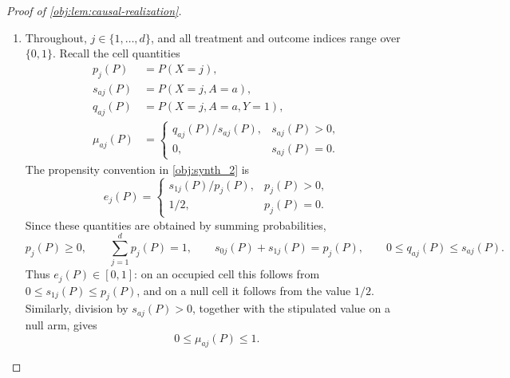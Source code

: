 \begin{proof}[Proof of \cref{obj:lem:causal-realization}]
\begin{enumerate}
\item
Throughout, \(j\in\{1,\ldots,d\}\), and all treatment and outcome indices range over \(\{0,1\}\). Recall the cell quantities
\[
\begin{aligned}
p_j(P)&=P(X=j),\\
s_{aj}(P)&=P(X=j,A=a),\\
q_{aj}(P)&=P(X=j,A=a,Y=1),\\
\mu_{aj}(P)&=
\begin{cases}
q_{aj}(P)/s_{aj}(P),&s_{aj}(P)>0,\\
0,&s_{aj}(P)=0.
\end{cases}
\end{aligned}
\]
The propensity convention in \cref{obj:synth_2} is
\[
e_j(P)=
\begin{cases}
s_{1j}(P)/p_j(P),&p_j(P)>0,\\
1/2,&p_j(P)=0.
\end{cases}
\]
Since these quantities are obtained by summing probabilities,
\[
p_j(P)\ge0,\qquad
\sum_{j=1}^{d}p_j(P)=1,\qquad
s_{0j}(P)+s_{1j}(P)=p_j(P),\qquad
0\le q_{aj}(P)\le s_{aj}(P).
\]
Thus \(e_j(P)\in[0,1]\): on an occupied cell this follows from
\(0\le s_{1j}(P)\le p_j(P)\), and on a null cell it follows from the
value \(1/2\). Similarly, division by \(s_{aj}(P)>0\), together with
the stipulated value on a null arm, gives
\[
0\le\mu_{aj}(P)\le1.
\]


\end{enumerate}
\end{proof}
